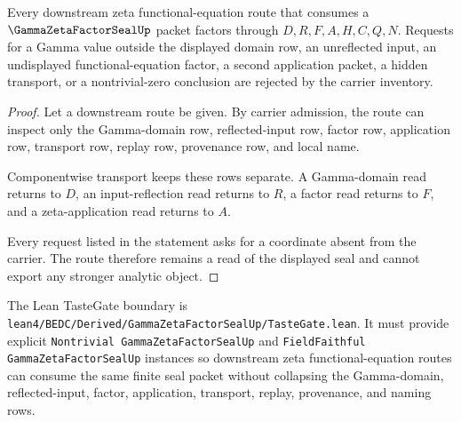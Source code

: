 \begin{theorem}
\label{thm:gamma-zeta-factor-seal-non-escape}
Every downstream zeta functional-equation route that consumes a
$\GammaZetaFactorSealUp$ packet factors through $D,R,F,A,H,C,Q,N$. Requests for
a Gamma value outside the displayed domain row, an unreflected input, an
undisplayed functional-equation factor, a second application packet, a hidden
transport, or a nontrivial-zero conclusion are rejected by the carrier
inventory.
\end{theorem}
\begin{proof}
Let a downstream route be given. By carrier admission, the route can inspect
only the Gamma-domain row, reflected-input row, factor row, application row,
transport row, replay row, provenance row, and local name.

Componentwise transport keeps these rows separate. A Gamma-domain read returns
to $D$, an input-reflection read returns to $R$, a factor read returns to $F$,
and a zeta-application read returns to $A$.

Every request listed in the statement asks for a coordinate absent from the
carrier. The route therefore remains a read of the displayed seal and cannot
export any stronger analytic object.
\end{proof}



The Lean TasteGate boundary is
\texttt{lean4/BEDC/Derived/GammaZetaFactorSealUp/TasteGate.lean}. It must
provide explicit \texttt{Nontrivial GammaZetaFactorSealUp} and
\texttt{FieldFaithful GammaZetaFactorSealUp} instances so downstream zeta
functional-equation routes can consume the same finite seal packet without
collapsing the Gamma-domain, reflected-input, factor, application, transport,
replay, provenance, and naming rows.


